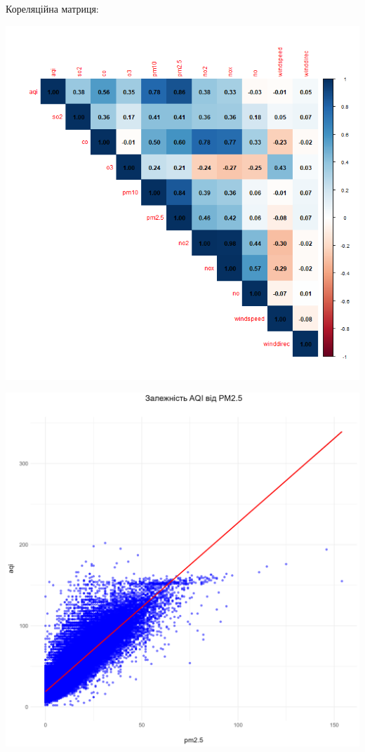 \documentclass[./report.tex]{subfiles}
\begin{document}
\begin{enumerate}
  \pagebreak

  Кореляційна матриця:

  \includegraphics[width=\linewidth]{plots/question1/corr_matrix_plot.png}

  \includegraphics[width=\linewidth]{plots/question1/aqi_pm2_5_diagram.png}


\end{enumerate}
\end{document}
